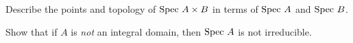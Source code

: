 \begin{problem}
	Describe the points and topology of $\text{Spec } A \times B$
	in terms of $\Spec A$ and $\text{Spec } B$.
\end{problem}

\begin{problem}
	Show that if $A$ is \emph{not}
	an integral domain,
	then $\Spec A$ is not irreducible.
\end{problem}

\endinput

\begin{problem}
	[From Andrew Critch]
	\gim
	Let $A$ be a Noetherian ring.
	Show that $A$ is an integral domain if and only if it has no idempotents,
	and $A_\kp$ is an integral domain for every prime $\kp$.
	\begin{hint}
		Show that if $\Spec A$ is connected and its stalks are irreducible,
		then $\Spec A$ is itself irreducible.
		Consider nilradical $N = \sqrt{(0)}$.
	\end{hint}
	\begin{sol}
		This is the proposition on the second page of
		\url{http://www.acritch.com/media/math/Stalk-local_detection_of_irreducibility.pdf}
	\end{sol}
\end{problem}
